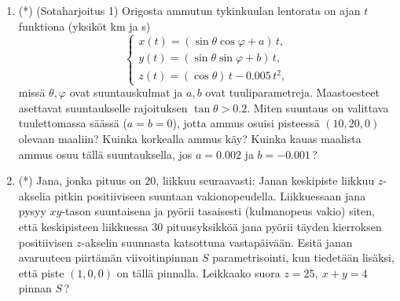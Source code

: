 \begin{enumerate}
\item (*) 
(Sotaharjoitus 1) Origosta ammutun tykinkuulan lentorata on ajan $t$ funktiona (yksiköt km ja s)
\[ \begin{cases}
x(t)=(\sin\theta\cos\varphi+a)\,t, \\
y(t)=(\sin\theta\sin\varphi+b)\,t, \\
z(t)=(\cos\theta)\,t-0.005\,t^2,
\end{cases} \]
missä $\theta,\varphi$ ovat suuntauskulmat ja $a,b$ ovat tuuliparametreja. Maastoesteet
asettavat suuntaukselle rajoituksen $\tan\theta > 0.2$. Miten suuntaus on valittava 
tuulettomassa säässä ($a=b=0$), jotta ammus osuisi pisteessä $(10,20,0)$ olevaan maaliin? 
Kuinka korkealla ammus käy? Kuinka kauas maalista ammus osuu tällä suuntauksella, jos 
$a=0.002$ ja $b=-0.001$\,? %

\item (*)
Jana, jonka pituus on $20$, liikkuu seuraavasti: Janan keskipiste liikkuu $z$-akselia pitkin
positiiviseen suuntaan vakionopeudella. Liikkuessaan jana pysyy $xy$-tason suuntaisena ja pyörii
tasaisesti (kulmanopeus vakio) siten, että keskipisteen liikkuessa $30$ pituusyksikköä
jana pyörii täyden kierroksen positiivisen $z$-akselin suunnasta katsottuna vastapäivään.
Esitä janan avaruuteen piirtämän viivoitinpinnan $S$ parametrisointi, kun tiedetään lisäksi,
että piste $(1,0,0)$ on tällä pinnalla. Leikkaako suora $z=25,\ x+y=4$ pinnan $S$\,?

\end{enumerate}